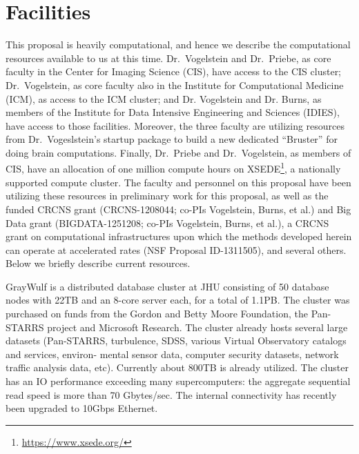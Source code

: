 \documentclass[11pt]{nih}
\begin{document}


\section*{Facilities} 



This proposal is heavily computational, and hence we describe the computational resources available to us at this time.  Dr.~Vogelstein and Dr.~Priebe, as core faculty in the Center for Imaging Science (CIS), have access to the CIS cluster; Dr.~Vogelstein, as core faculty also in the Institute for Computational Medicine (ICM), as access to the ICM cluster; and Dr. Vogelstein and Dr. Burns, as members of the Institute for Data Intensive Engineering and Sciences (IDIES), have access to those facilities.  Moreover, the three faculty are utilizing resources from Dr.~Vogeslstein's startup package to build a new dedicated ``Bruster'' for doing brain computations.  Finally, Dr.~Priebe and Dr.~Vogelstein, as members of CIS, have an allocation of one million compute hours on XSEDE\footnote{\url{https://www.xsede.org/}}, a nationally supported compute cluster.  The faculty and personnel on this proposal have been utilizing these resources  in preliminary work for this proposal, as well as the funded CRCNS grant (CRCNS-1208044; co-PIs Vogelstein, Burns, et al.) and Big Data grant (BIGDATA-1251208; co-PIs Vogelstein, Burns, et al.),  a CRCNS grant on computational infrastructures upon which the methods developed herein can operate at accelerated rates (NSF Proposal ID-1311505), and several others.  Below we briefly describe current resources.




GrayWulf is a distributed database cluster at JHU consisting of 50 database nodes with 22TB and an 8-core server each, for a total of 1.1PB. The cluster was purchased on funds from the Gordon and Betty Moore Foundation, the Pan-STARRS project and Microsoft Research. The cluster already hosts several large datasets (Pan-STARRS, turbulence, SDSS, various Virtual Observatory catalogs and services, environ- mental sensor data, computer security datasets, network traffic analysis data, etc). Currently about 800TB is already utilized. The cluster has an IO performance exceeding many supercomputers: the aggregate sequential read speed is more than 70 Gbytes/sec. The internal connectivity has recently been upgraded to 10Gbps Ethernet.
\end{document}
